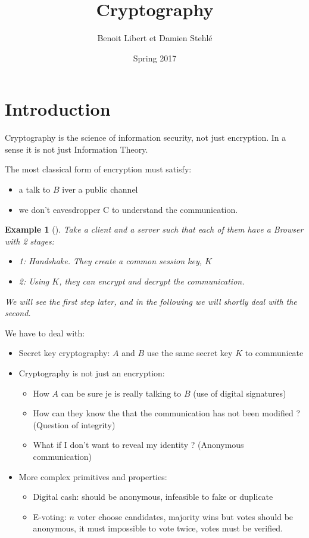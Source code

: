 \documentclass{article}
\title{Cryptography}
\author{Benoit Libert et Damien Stehlé	}
\date{Spring 2017}
\newtheorem{ex}[thm]{Example}
\newcommand{\Ex}[3]{\begin{ex}[#1]\label{#2}#3\end{ex}}
\begin{document}
\maketitle

\tableofcontents

\newpage

\section{Introduction}
Cryptography is the science of information security, not just encryption. In a sense it is not just Information Theory.

The most classical form of encryption must satisfy:
\begin{itemize}
\item a talk to $B$ iver a public channel
\item we don't eavesdropper C to understand the communication.
\end{itemize}

\Ex{}{}{Take a client and a server such that each of them have a Browser with 2 stages:
\begin{itemize}
\item 1: Handshake. They create a common session key, $K$
\item 2: Using $K$, they can encrypt and decrypt the communication.
\end{itemize}

We will see the first step later, and in the following we will shortly deal with the second.
}

We have to deal with:
\begin{itemize}
\item Secret key cryptography: $A$ and $B$ use the same secret key $K$ to communicate
\item Cryptography is not just an encryption:
\begin{itemize}
\item How $A$ can be sure je is really talking to $B$ (use of digital signatures)
\item How can they know the that the communication has not been modified ? (Question of integrity)
\item What if I don't want to reveal my identity ? (Anonymous communication)
\end{itemize} 
\item More complex primitives and properties:
\begin{itemize}
\item Digital cash: should be anonymous, infeasible to fake or duplicate
\item E-voting: $n$ voter choose candidates, majority wins but votes should be anonymous, it must impossible to vote twice, votes must be verified.
\end{itemize}
\end{itemize}
\end{document}
